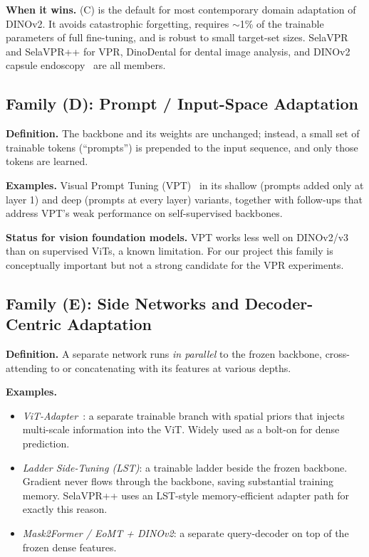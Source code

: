 \documentclass[11pt,a4paper]{article}
\begin{document}
\textbf{When it wins.} (C) is the default for most contemporary domain
adaptation of DINOv2. It avoids catastrophic forgetting, requires
$\sim$1\% of the trainable parameters of full fine-tuning, and is robust
to small target-set sizes. SelaVPR and SelaVPR++ for VPR, DinoDental for
dental image analysis, and DINOv2 capsule endoscopy~\citep{oquab2024dinov2}
are all members.

\subsection{Family (D): Prompt / Input-Space Adaptation}

\textbf{Definition.} The backbone and its weights are unchanged; instead,
a small set of trainable tokens (``prompts'') is prepended to the input
sequence, and only those tokens are learned.

\textbf{Examples.} Visual Prompt Tuning (VPT)~\citep{jia2022vpt} in its
shallow (prompts added only at layer 1) and deep (prompts at every
layer) variants, together with follow-ups that address VPT's weak
performance on self-supervised backbones.

\textbf{Status for vision foundation models.} VPT works less well on
DINOv2/v3 than on supervised ViTs, a known limitation. For our project
this family is conceptually important but not a strong candidate for the
VPR experiments.

\subsection{Family (E): Side Networks and Decoder-Centric Adaptation}

\textbf{Definition.} A separate network runs \emph{in parallel} to the
frozen backbone, cross-attending to or concatenating with its features
at various depths.

\textbf{Examples.}
\begin{itemize}[leftmargin=*]
  \item \emph{ViT-Adapter}~\citep{chen2022vitadapter}: a separate
  trainable branch with spatial priors that injects multi-scale
  information into the ViT. Widely used as a bolt-on for dense
  prediction.
  \item \emph{Ladder Side-Tuning (LST)}: a trainable ladder beside the
  frozen backbone. Gradient never flows through the backbone, saving
  substantial training memory. SelaVPR++ uses an LST-style memory-efficient
  adapter path for exactly this reason.
  \item \emph{Mask2Former / EoMT + DINOv2}: a separate query-decoder
  on top of the frozen dense features.
\end{itemize}
\end{document}
